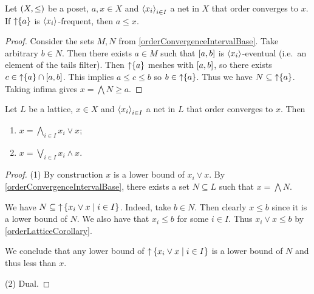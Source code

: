 \begin{lemma}
Let $\sSet{X,\leq}$ be a poset, $a,x\in X$ and $\left\langle x_i \right\rangle_{i\in I}$ a net in $X$ that order converges to $x$. If $\operatorname{\uparrow}\{a\}$ is $\left\langle x_i \right\rangle$-frequent, then $a\leq x$.
\end{lemma}
\begin{proof}
Consider the sets $M,N$ from \ref{orderConvergenceIntervalBase}. Take arbitrary $b\in N$. Then there exists $a\in M$ such that $\interval{a,b}$ is $\left\langle x_i \right\rangle$-eventual (i.e.\ an element of the tails filter). Then $\operatorname{\uparrow}\{a\}$ meshes with $\interval{a,b}$, so there exists $c\in \upset\{a\}\cap \interval{a,b}$. This implies $a\leq c\leq b$ so $b\in \operatorname{\uparrow}\{a\}$. Thus we have $N\subseteq \operatorname{\uparrow}\{a\}$. Taking infima gives $x = \bigwedge N \geq a$.
\end{proof}

\begin{lemma} \label{orderLimitMeetJoin}
Let $L$ be a lattice, $x\in X$ and $\left\langle x_i \right\rangle_{i\in I}$ a net in $L$ that order converges to $x$. Then
\begin{enumerate}
\item $x = \bigwedge_{i\in I}x_i \vee x$;
\item $x = \bigvee_{i\in I}x_i \wedge x$.
\end{enumerate}
\end{lemma}
\begin{proof}
(1) By construction $x$ is a lower bound of $x_i \vee x$. By \ref{orderConvergenceIntervalBase}, there exists a set $N\subseteq L$ such that $x = \bigwedge N$.

We have $N\subseteq \upset\setbuilder{x_i \vee x}{i\in I}$. Indeed, take $b\in N$. Then clearly $x\leq b$ since it is a lower bound of $N$. We also have that $x_i \leq b$ for some $i\in I$. Thus $x_i\vee x \leq b$ by \ref{orderLatticeCorollary}.

We conclude that any lower bound of $\upset\setbuilder{x_i \vee x}{i\in I}$ is a lower bound of $N$ and thus less than $x$.

(2) Dual.
\end{proof}


